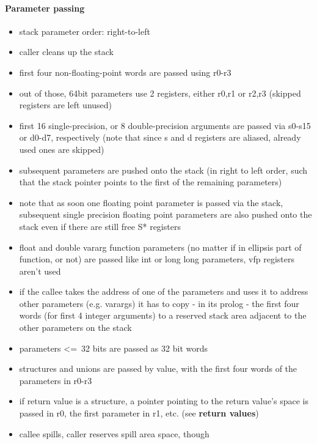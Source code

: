 \paragraph{Parameter passing}

\begin{itemize}
\item stack parameter order: right-to-left
\item caller cleans up the stack
\item first four non-floating-point words are passed using r0-r3
\item out of those, 64bit parameters use 2 registers, either r0,r1 or r2,r3 (skipped registers are left unused)
\item first 16 single-precision, or 8 double-precision arguments are passed via s0-s15 or d0-d7, respectively (note that since s and d registers are aliased, already used ones are skipped)
\item subsequent parameters are pushed onto the stack (in right to left order, such that the stack pointer points to the first of the remaining parameters)
\item note that as soon one floating point parameter is passed via the stack, subsequent single precision floating point parameters are also pushed onto the stack even if there are still free S* registers
\item float and double vararg function parameters (no matter if in ellipsis part of function, or not) are passed like int or long long parameters, vfp registers aren't used
\item if the callee takes the address of one of the parameters and uses it to address other parameters (e.g. varargs) it has to copy - in its prolog - the first four words (for first 4 integer arguments) to a reserved stack area adjacent to the other parameters on the stack
\item parameters \textless=\ 32 bits are passed as 32 bit words
\item structures and unions are passed by value, with the first four words of the parameters in r0-r3
\item if return value is a structure, a pointer pointing to the return value's space is passed in r0, the first parameter in r1, etc. (see {\bf return values})
\item callee spills, caller reserves spill area space, though
\end{itemize}

